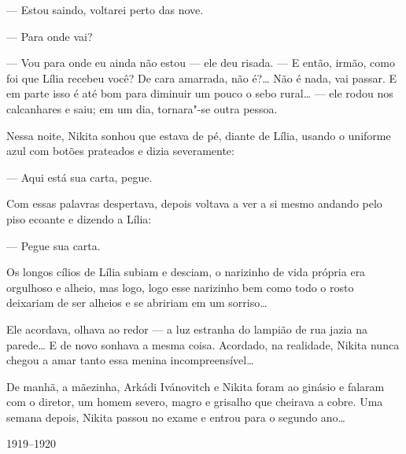 --- Estou saindo, voltarei perto das nove.

--- Para onde vai?

--- Vou para onde eu ainda não estou --- ele deu risada. --- E então,
irmão, como foi que Lília recebeu você? De cara amarrada, não é?\ldots{} Não
é nada, vai passar. E em parte isso é até bom para diminuir um pouco o
sebo rural\ldots{} --- ele rodou nos calcanhares e saiu; em um dia,
tornara"-se outra pessoa.

Nessa noite, Nikita sonhou que estava de pé, diante de Lília, usando o
uniforme azul com botões prateados e dizia severamente:

--- Aqui está sua carta, pegue.

Com essas palavras despertava, depois voltava a ver a si mesmo andando
pelo piso ecoante e dizendo a Lília:

--- Pegue sua carta.

Os longos cílios de Lília subiam e desciam, o narizinho de vida própria
era orgulhoso e alheio, mas logo, logo esse narizinho bem como todo o
rosto deixariam de ser alheios e se abririam em um sorriso\ldots{}

Ele acordava, olhava ao redor --- a luz estranha do lampião de rua jazia
na parede\ldots{} E de novo sonhava a mesma coisa. Acordado, na
realidade, Nikita nunca chegou a amar tanto essa menina incompreensível\ldots{}

De manhã, a mãezinha, Arkádi Ivánovitch e Nikita foram ao ginásio e
falaram com o diretor, um homem severo, magro e grisalho que cheirava a
cobre. Uma semana depois, Nikita passou no exame e entrou para o segundo
ano\ldots{}

\bigskip

\begin{flushright}
{\small
1919--1920
}
\end{flushright}

\pagebreak
\blankpage

